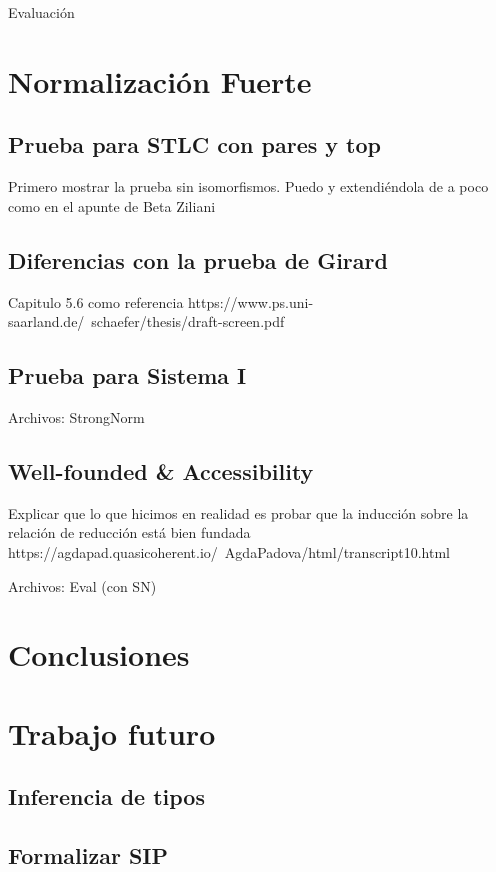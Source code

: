 \documentclass[]{report}
\begin{document}
	\begin{codigo}
		Evaluación
	\end{codigo}
	
	
	\section{Normalización Fuerte}
	
	\subsection{Prueba para STLC con pares y top}
	Primero mostrar la prueba sin isomorfismos. Puedo y extendiéndola de a poco como en el apunte de Beta Ziliani
	\subsection{Diferencias con la prueba de Girard}
	Capitulo 5.6 como referencia
	https://www.ps.uni-saarland.de/~schaefer/thesis/draft-screen.pdf

	\subsection{Prueba para Sistema I}
	
	
	Archivos: StrongNorm
	
	\subsection{Well-founded \& Accessibility}
	Explicar que lo que hicimos en realidad es probar que la inducción sobre la relación de reducción está bien fundada
	https://agdapad.quasicoherent.io/~AgdaPadova/html/transcript10.html
	
	Archivos: Eval (con SN)
	
	\section{Conclusiones}
	
	
	\section{Trabajo futuro}
	\subsection{Inferencia de tipos}
	\subsection{Formalizar SIP}
	
	
	\printbibliography
	
\end{document}

